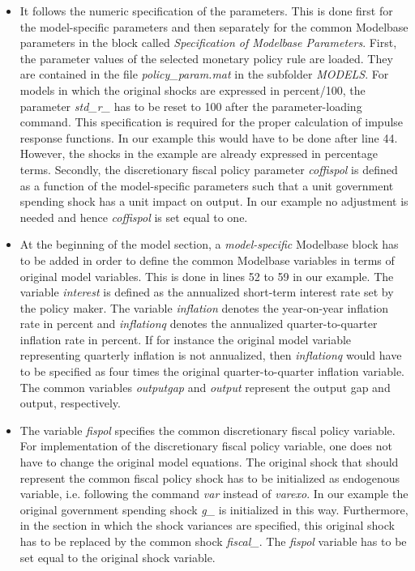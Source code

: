 \begin{itemize}
\item It follows the numeric specification of the parameters. This is done first for the model-specific parameters and then separately for the common Modelbase parameters in the block called \textit{Specification of Modelbase Parameters}. First, the parameter values of the selected monetary policy rule are loaded. They are contained in the file \textit{policy\_param.mat} in the subfolder \textit{MODELS}. For models in which the original shocks are expressed in percent/100, the parameter \textit{std\_r\_} has to be reset to 100 after the parameter-loading command. This specification is required for the proper calculation of impulse response functions. In our example this would have to be done after line 44. However, the shocks in the example are already expressed in percentage terms. Secondly, the discretionary fiscal policy parameter \textit{coffispol} is defined as a function of the model-specific parameters such that a unit government spending shock has a unit impact on output. In our example no adjustment is needed and hence \textit{coffispol} is set equal to one. %
\item At the beginning of the model section, a \textit{model-specific} Modelbase block has to be added in order to define the common Modelbase variables in terms of original model variables. This is done in lines 52 to 59 in our example. The variable \textit{interest} is defined as the annualized short-term interest rate set by the policy maker. The variable \textit{inflation} denotes the year-on-year inflation rate in percent and \textit{inflationq} denotes the annualized quarter-to-quarter inflation rate in percent. If for instance the original model variable representing quarterly inflation is not annualized, then \textit{inflationq} would have to be specified as four times the original quarter-to-quarter inflation variable. The common variables \textit{outputgap} and \textit{output} represent the output gap and output, respectively.
\item The variable \textit{fispol} specifies the common discretionary fiscal policy variable. For implementation of the discretionary fiscal policy variable, one does not have to change the original model equations. The original shock that should represent the common fiscal policy shock has to be initialized as endogenous variable, i.e. following the command \textit{var} instead of \textit{varexo}. In our example the original government spending shock \textit{g\_} is initialized in this way. Furthermore, in the section in which the shock variances are specified, this original shock has to be replaced by the common shock \textit{fiscal\_}. The \textit{fispol} variable has to be set equal to the original shock variable.

\end{itemize}
